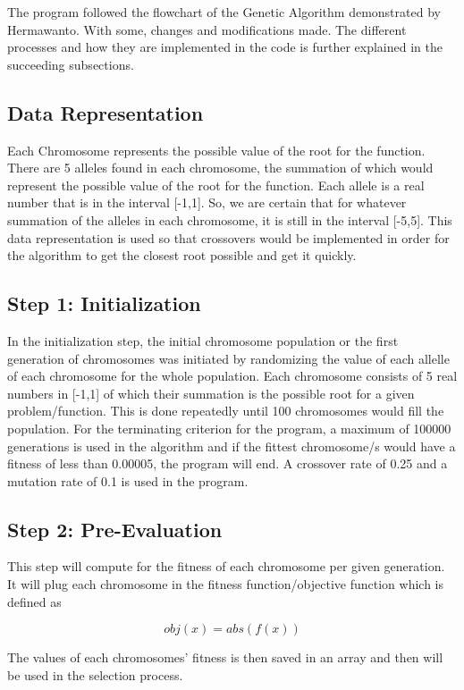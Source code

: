 \documentclass{acm_proc_article-sp}
\begin{document}
The program followed the flowchart of the Genetic Algorithm demonstrated by Hermawanto. With some, changes and modifications made. The different processes and how they are implemented in the code is further explained in the succeeding subsections.

\subsection{Data Representation}
Each Chromosome represents the possible value of the root for the function. There are 5 alleles found in each chromosome, the summation of which would represent the possible value of the root for the function. Each allele is a real number that is in the interval [-1,1]. So, we are certain that for whatever summation of the alleles in each chromosome, it is still in the interval [-5,5]. This data representation is used so that crossovers would be implemented in order for the algorithm to get the closest root possible and get it quickly.

\subsection{Step 1: Initialization}
In the initialization step, the initial chromosome population or the first generation of chromosomes was initiated by randomizing the value of each allelle of each chromosome for the whole population. Each chromosome consists of 5 real numbers in [-1,1] of which their summation is the possible root for a given problem/function. This is done repeatedly until 100 chromosomes would fill the population. For the terminating criterion for the program, a maximum of 100000 generations is used in the algorithm and if the fittest chromosome/s would have a fitness of less than 0.00005, the program will end. A crossover rate of 0.25 and a mutation rate of 0.1 is used in the program.

\subsection{Step 2: Pre-Evaluation}
This step will compute for the fitness of each chromosome per given generation. It will plug each chromosome in the fitness function/objective function which is defined as 

\begin{equation}
obj(x) = abs(f(x))
\end{equation}

The values of each chromosomes' fitness is then saved in an array and then will be used in the selection process.
\end{document}
